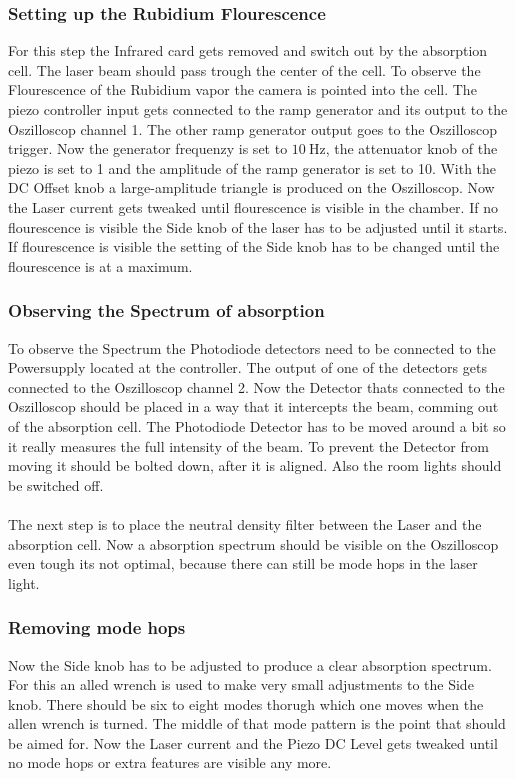 \subsubsection{Setting up the Rubidium Flourescence}
\label{sec:flourescence}
For this step the Infrared card gets removed and switch out by the absorption cell.
The laser beam should pass trough the center of the cell.
To observe the Flourescence of the Rubidium vapor the camera is pointed into the cell.
The piezo controller input gets connected to the ramp generator and its output to the Oszilloscop channel 1.
The other ramp generator output goes to the Oszilloscop trigger.
Now the generator frequenzy is set to $\SI{10}{\Hz}$, the attenuator knob of the piezo is set to 1 and the amplitude of the ramp generator is set to 10.
With the DC Offset knob a large-amplitude triangle is produced on the Oszilloscop.
Now the Laser current gets tweaked until flourescence is visible in the chamber.
If no flourescence is visible the Side knob of the laser has to be adjusted until it starts.
If flourescence is visible the setting of the Side knob has to be changed until the flourescence is at a maximum.

\subsubsection{Observing the Spectrum of absorption}
To observe the Spectrum the Photodiode detectors need to be connected to the Powersupply located at the controller.
The output of one of the detectors gets connected to the Oszilloscop channel 2.
Now the Detector thats connected to the Oszilloscop should be placed in a way that it intercepts the beam, comming out of the absorption cell.
The Photodiode Detector has to be moved around a bit so it really measures the full intensity of the beam.
To prevent the Detector from moving it should be bolted down, after it is aligned.
Also the room lights should be switched off.
\\\\
The next step is to place the neutral density filter between the Laser and the absorption cell.
Now a absorption spectrum should be visible on the Oszilloscop even tough its not optimal, because there can still be mode hops in the laser light.

\subsubsection{Removing mode hops}
Now the Side knob has to be adjusted to produce a clear absorption spectrum.
For this an alled wrench is used to make very small adjustments to the Side knob.
There should be six to eight modes thorugh which one moves when the allen wrench is turned.
The middle of that mode pattern is the point that should be aimed for.
Now the Laser current and the Piezo DC Level gets tweaked until no mode hops or extra features are visible any more.

